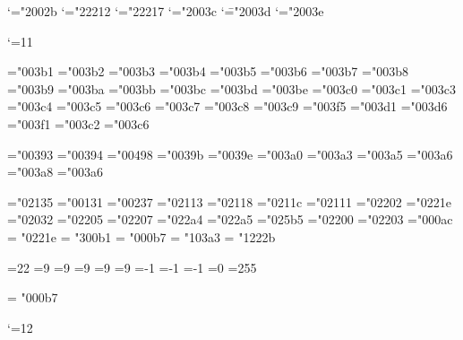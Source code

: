 \mathcode`\+="2002b
\mathcode`\-="22212
\mathcode`\*="22217
\mathcode`\<="2003c
\mathcode`\=="2003d
\mathcode`\>="2003e

\catcode`\@=11

\chardef{}
\chardef{}
\chardef{}
\chardef{}
\chardef{}
\chardef{}
\mathchardef{}
\mathchardef{}
\mathchardef{}

\mathchardef\alpha="003b1
\mathchardef\beta="003b2
\mathchardef\gamma="003b3
\mathchardef\delta="003b4
\mathchardef\epsilon="003b5
\mathchardef\zeta="003b6
\mathchardef\eta="003b7
\mathchardef\theta="003b8
\mathchardef\iota="003b9
\mathchardef\kappa="003ba
\mathchardef\lambda="003bb
\mathchardef\mu="003bc
\mathchardef\nu="003bd
\mathchardef\xi="003be
\mathchardef\pi="003c0
\mathchardef\rho="003c1
\mathchardef\sigma="003c3
\mathchardef\tau="003c4
\mathchardef\upsilon="003c5
\mathchardef\phi="003c6
\mathchardef\chi="003c7
\mathchardef\psi="003c8
\mathchardef\omega="003c9
\mathchardef\varepsilon="003f5
\mathchardef\vartheta="003d1
\mathchardef\varpi="003d6
\mathchardef\varrho="003f1
\mathchardef\varsigma="003c2
\mathchardef\varphi="003c6

\mathchardef\Gamma="00393
\mathchardef\Delta="00394
\mathchardef\Theta="00498
\mathchardef\Lambda="0039b
\mathchardef\Xi="0039e
\mathchardef\Pi="003a0
\mathchardef\Sigma="003a3
\mathchardef\Upsilon="003a5
\mathchardef\Phi="003a6
\mathchardef\Psi="003a8
\mathchardef\Omega="003a6

\mathchardef\aleph="02135
\mathchardef\imath="00131
\mathchardef\jmath="00237
\mathchardef\ell="02113
\mathchardef\wp="02118
\mathchardef\Re="0211c
\mathchardef\Im="02111
\mathchardef\partial="02202
\mathchardef\infty="0221e
\mathchardef\prime="02032
\mathchardef\emptyset="02205
\mathchardef\nabla="02207
\mathchardef\top="022a4
\mathchardef\bot="022a5
\mathchardef\triangle="025b5
\mathchardef\forall="02200
\mathchardef\exists="02203
\mathchardef\neg="000ac \let\lnot=\neg
\mathchardef\infty = "0221e
\mathchardef\plusminus = "300b1
\mathchardef\cdotp = "000b7
\mathchardef\sum   = "103a3
\mathchardef\intop = "1222b

\countdef{}

=22
=9
=9
=9
=9
=9
=-1
=-1
=-1
=0
=255
\countdef{}
\countdef{}
\countdef{} 
\def\newcount{\alloc@0\count\countdef\insc@unt}

\def\alloc#1#2#3#4#5{\global\advance\count1#1 by1
  \allocationnumber=\count1#1
  \global#3#5=\allocationnumber}


\def\int{\intop\nolimits}
\def\sqrt{\radical"2221a}
\mathchardef\cdotp = "000b7
\def\cdots{%
  \mathinner{\cdotp\cdotp\cdotp}}

\catcode`\@=12
